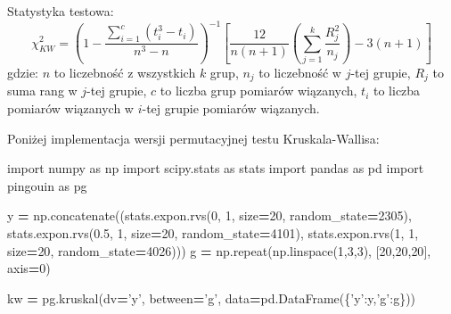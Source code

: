 \documentclass[polish,]{book}
\newenvironment{Shaded}{\begin{snugshade}}{\end{snugshade}}
\newcommand{\DecValTok}[1]{\textcolor[rgb]{0.00,0.00,0.81}{#1}}
\newcommand{\FloatTok}[1]{\textcolor[rgb]{0.00,0.00,0.81}{#1}}
\newcommand{\ImportTok}[1]{#1}
\newcommand{\NormalTok}[1]{#1}
\newcommand{\OperatorTok}[1]{\textcolor[rgb]{0.81,0.36,0.00}{\textbf{#1}}}
\newcommand{\StringTok}[1]{\textcolor[rgb]{0.31,0.60,0.02}{#1}}
\begin{document}
Statystyka testowa:
\begin{equation}
\chi^2_{KW}=\left(1-\frac{\sum_{i=1}^{c}(t_i^3-t_i)}{n^3-n}\right)^{-1}\left[\frac{12}{n(n+1)}\left(\sum_{j=1}^{k}\frac{R_j^2}{n_j}\right)-3(n+1)\right]
\label{eq:mw10}
\end{equation}
gdzie: \(n\) to liczebność z wszystkich \(k\) grup, \(n_j\) to liczebność w \(j\)-tej grupie, \(R_j\) to suma rang w \(j\)-tej grupie, \(c\) to liczba grup pomiarów wiązanych, \(t_i\) to liczba pomiarów wiązanych w \(i\)-tej grupie pomiarów wiązanych.

Poniżej implementacja wersji permutacyjnej testu Kruskala-Wallisa:

\begin{Shaded}
\begin{Highlighting}[]
\ImportTok{import}\NormalTok{ numpy }\ImportTok{as}\NormalTok{ np}
\ImportTok{import}\NormalTok{ scipy.stats }\ImportTok{as}\NormalTok{ stats}
\ImportTok{import}\NormalTok{ pandas }\ImportTok{as}\NormalTok{ pd}
\ImportTok{import}\NormalTok{ pingouin }\ImportTok{as}\NormalTok{ pg}

\NormalTok{y }\OperatorTok{=}\NormalTok{ np.concatenate((stats.expon.rvs(}\DecValTok{0}\NormalTok{, }\DecValTok{1}\NormalTok{, size}\OperatorTok{=}\DecValTok{20}\NormalTok{, random_state}\OperatorTok{=}\DecValTok{2305}\NormalTok{),}
\NormalTok{                    stats.expon.rvs(}\FloatTok{0.5}\NormalTok{, }\DecValTok{1}\NormalTok{, size}\OperatorTok{=}\DecValTok{20}\NormalTok{, random_state}\OperatorTok{=}\DecValTok{4101}\NormalTok{),}
\NormalTok{                    stats.expon.rvs(}\DecValTok{1}\NormalTok{, }\DecValTok{1}\NormalTok{, size}\OperatorTok{=}\DecValTok{20}\NormalTok{, random_state}\OperatorTok{=}\DecValTok{4026}\NormalTok{)))}
\NormalTok{g }\OperatorTok{=}\NormalTok{ np.repeat(np.linspace(}\DecValTok{1}\NormalTok{,}\DecValTok{3}\NormalTok{,}\DecValTok{3}\NormalTok{), [}\DecValTok{20}\NormalTok{,}\DecValTok{20}\NormalTok{,}\DecValTok{20}\NormalTok{], axis}\OperatorTok{=}\DecValTok{0}\NormalTok{)}

\NormalTok{kw }\OperatorTok{=}\NormalTok{ pg.kruskal(dv}\OperatorTok{=}\StringTok{'y'}\NormalTok{, between}\OperatorTok{=}\StringTok{'g'}\NormalTok{, data}\OperatorTok{=}\NormalTok{pd.DataFrame(\{}\StringTok{'y'}\NormalTok{:y,}\StringTok{'g'}\NormalTok{:g\}))}


\end{Highlighting}
\end{Shaded}
\end{document}

